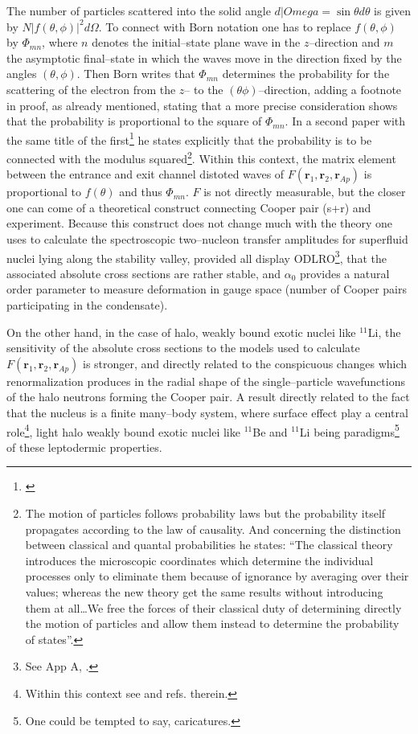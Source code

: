 The number of particles scattered into the solid angle $d|Omega=\sin\theta d\theta$ is given by $N|f(\theta,\phi)|^2d\Omega$. To connect with Born notation one has to replace $f(\theta,\phi)$ by $\Phi_{mn}$, where $n$ denotes the initial--state plane wave in the $z$--direction and $m$ the asymptotic final--state in which the waves move in the direction fixed by the angles $(\theta,\phi)$. Then Born writes that $\Phi_{mn}$ determines the probability for the scattering of the electron from the $z$-- to the $(\theta\phi)$--direction, adding a footnote in proof, as already mentioned, stating that a more precise consideration shows that the probability is proportional to the square of $\Phi_{mn}$. In a second paper with the same title of the first\footnote{\cite{Born:26b}} he states explicitly that the probability is to be connected with the modulus squared\footnote{The motion of particles follows probability laws but the probability itself propagates according to the law of causality. And concerning the distinction between classical and quantal probabilities he states: ``The classical theory introduces the microscopic coordinates which determine the individual processes only to eliminate them because of ignorance by averaging over their values; whereas the new theory get the same results without introducing them at all\dots We free the forces of their classical duty of determining directly the motion of particles and allow them instead to determine the probability of states''.}. Within this context, the matrix element between the entrance and exit channel distoted waves of $F(\mathbf r_1,\mathbf r_2,\mathbf r_{Ap})$ is proportional to $f(\theta)$ and thus $\Phi_{mn}$. $F$ is not directly measurable, but the closer one can come of a theoretical construct connecting Cooper pair (s+r) and experiment. Because this construct does not change much with the theory one uses to calculate the spectroscopic two--nucleon transfer amplitudes for superfluid nuclei lying along the stability valley, provided all display ODLRO\footnote{See App A, \cite{Potel:17}.}, that the associated absolute cross sections are rather stable, and $\alpha_0$ provides a natural order parameter to measure deformation in gauge space (number of Cooper pairs participating in the condensate).


On the other hand, in the case of halo, weakly bound exotic nuclei like $^{11}$Li, the sensitivity of the absolute cross sections to the models used to calculate $F(\mathbf r_1,\mathbf r_2,\mathbf r_{Ap})$ is stronger, and directly related to the conspicuous changes which renormalization produces in the radial shape of the single--particle wavefunctions of the halo neutrons forming the Cooper pair. A result directly related to the fact that the nucleus is a finite many--body system, where surface effect play a central role\footnote{Within this context see \cite{Broglia:02d} and refs. therein.}, light halo weakly bound exotic nuclei like $^{11}$Be and $^{11}$Li being paradigms\footnote{One could be tempted to say, caricatures.} of these leptodermic properties. 


